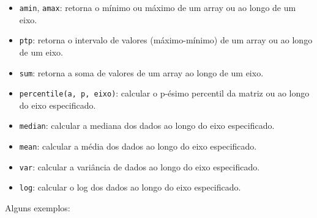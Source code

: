 \documentclass[
  brazilian,
  letterpaper,
  DIV=11,
  numbers=noendperiod]{scrreprt}
\providecommand{\tightlist}{%
  \setlength{\itemsep}{0pt}\setlength{\parskip}{0pt}}
\begin{document}
\begin{itemize}
\tightlist
\item
  \texttt{amin}, \texttt{amax}: retorna o mínimo ou máximo de um array
  ou ao longo de um eixo.
\item
  \texttt{ptp}: retorna o intervalo de valores (máximo-mínimo) de um
  array ou ao longo de um eixo.
\item
  \texttt{sum}: retorna a soma de valores de um array ao longo de um
  eixo.
\item
  \texttt{percentile(a,\ p,\ eixo)}: calcular o p-ésimo percentil da
  matriz ou ao longo do eixo especificado.
\item
  \texttt{median}: calcular a mediana dos dados ao longo do eixo
  especificado.
\item
  \texttt{mean}: calcular a média dos dados ao longo do eixo
  especificado.
\item
  \texttt{var}: calcular a variância de dados ao longo do eixo
  especificado.
\item
  \texttt{log}: calcular o log dos dados ao longo do eixo especificado.
\end{itemize}

Alguns exemplos:
\end{document}
